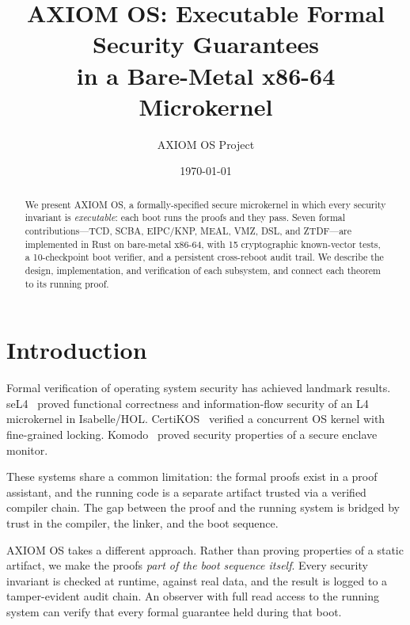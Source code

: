 \documentclass[10pt,twocolumn]{article}
\title{\textbf{AXIOM OS}: Executable Formal Security Guarantees\\
       in a Bare-Metal x86-64 Microkernel}
\author{AXIOM OS Project}
\date{\today}
\begin{document}
\maketitle

\begin{abstract}
We present AXIOM OS, a formally-specified secure microkernel in which every
security invariant is \emph{executable}: each boot runs the proofs and they
pass. Seven formal contributions---TCD, SCBA, EIPC/KNP, MEAL, VMZ, DSL, and
ZTDF---are implemented in Rust on bare-metal x86-64, with 15 cryptographic
known-vector tests, a 10-checkpoint boot verifier, and a persistent
cross-reboot audit trail. We describe the design, implementation, and
verification of each subsystem, and connect each theorem to its running proof.
\end{abstract}

\section{Introduction}

Formal verification of operating system security has achieved landmark results.
seL4~\cite{klein2009sel4} proved functional correctness and information-flow
security of an L4 microkernel in Isabelle/HOL\@. CertiKOS~\cite{gu2016certikos}
verified a concurrent OS kernel with fine-grained locking. Komodo~\cite{ferraiuolo2017komodo}
proved security properties of a secure enclave monitor.

These systems share a common limitation: the formal proofs exist in a proof
assistant, and the running code is a separate artifact trusted via a verified
compiler chain. The gap between the proof and the running system is bridged
by trust in the compiler, the linker, and the boot sequence.

AXIOM OS takes a different approach. Rather than proving properties of a
static artifact, we make the proofs \emph{part of the boot sequence itself}.
Every security invariant is checked at runtime, against real data, and the
result is logged to a tamper-evident audit chain. An observer with full read
access to the running system can verify that every formal guarantee held
during that boot.
\end{document}
